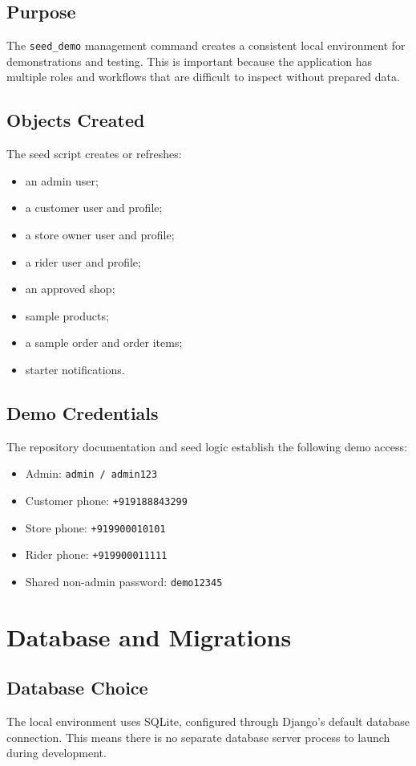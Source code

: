 \documentclass[12pt,a4paper]{article}
\begin{document}
\subsection{Purpose}
The \texttt{seed\_demo} management command creates a consistent local environment for demonstrations and testing. This is important because the application has multiple roles and workflows that are difficult to inspect without prepared data.

\subsection{Objects Created}
The seed script creates or refreshes:
\begin{itemize}[leftmargin=1.5em]
    \item an admin user;
    \item a customer user and profile;
    \item a store owner user and profile;
    \item a rider user and profile;
    \item an approved shop;
    \item sample products;
    \item a sample order and order items;
    \item starter notifications.
\end{itemize}

\subsection{Demo Credentials}
The repository documentation and seed logic establish the following demo access:
\begin{itemize}[leftmargin=1.5em]
    \item Admin: \texttt{admin / admin123}
    \item Customer phone: \texttt{+919188843299}
    \item Store phone: \texttt{+919900010101}
    \item Rider phone: \texttt{+919900011111}
    \item Shared non-admin password: \texttt{demo12345}
\end{itemize}

\section{Database and Migrations}
\subsection{Database Choice}
The local environment uses SQLite, configured through Django's default database connection. This means there is no separate database server process to launch during development.
\end{document}
